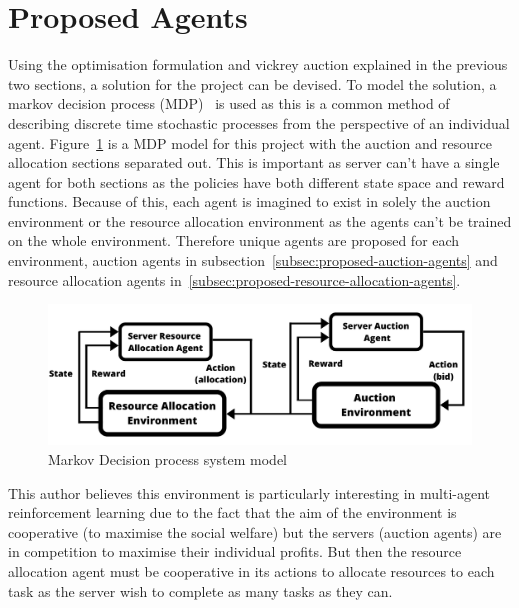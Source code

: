 \section{Proposed Agents}\label{sec:proposed-agents}
Using the optimisation formulation and vickrey auction explained in the previous two sections, a solution for the
project can be devised. To model the solution, a markov decision process (MDP)~\cite{Bel} is used as this is a common
method of describing discrete time stochastic processes from the perspective of an individual agent.
Figure~\ref{fig:mdp_system_model} is a MDP model for this project with the auction and resource allocation sections
separated out. This is important as server can't have a single agent for both sections as the policies have both
different state space and reward functions. Because of this, each agent is imagined to exist in solely the auction
environment or the resource allocation environment as the agents can't be trained on the whole environment.
Therefore unique agents are proposed for each environment, auction agents in
subsection~\ref{subsec:proposed-auction-agents} and resource allocation agents
in~\ref{subsec:proposed-resource-allocation-agents}.

\begin{figure}
    \centering
    \includegraphics[width=14cm]{figures/flexible_resource_allocation_env.pdf}
    \caption{Markov Decision process system model}
    \label{fig:mdp_system_model}
\end{figure}

This author believes this environment is particularly interesting in multi-agent reinforcement learning due to the fact
that the aim of the environment is cooperative (to maximise the social welfare) but the servers (auction agents) are in
competition to maximise their individual profits. But then the resource allocation agent must be cooperative in its
actions to allocate resources to each task as the server wish to complete as many tasks as they can.

